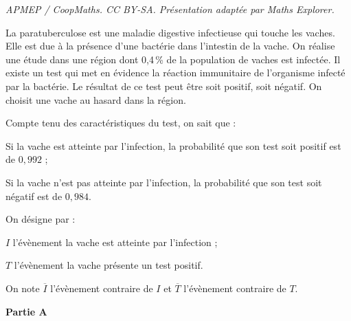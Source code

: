 \documentclass[10pt]{article}
\begin{document}
\noindent\textit{APMEP / CoopMaths. CC BY-SA. Présentation adaptée par Maths Explorer.}\par\medskip
\medskip

La paratuberculose est une maladie digestive infectieuse qui touche les vaches. Elle est due à la présence d'une bactérie dans l'intestin de la vache.
On réalise une étude dans une région dont 0,4\,\% de la population de vaches est infectée.
Il existe un test qui met en évidence la réaction immunitaire de l'organisme infecté par la bactérie.
Le résultat de ce test peut être soit \og positif\fg{}, soit \og négatif\fg{}.
On choisit une vache au hasard dans la région.

\begin{list}{\textbullet}{Compte tenu des caractéristiques du test, on sait que :}
\item Si la vache est atteinte par l'infection, la probabilité que son test soit positif est de $0,992$ ;
\item Si la vache n'est pas atteinte par l'infection, la probabilité que son test soit négatif est de $0,984$.
\end{list}

\begin{list}{\textbullet}{On désigne par :}
		\item $I$ l'évènement \og{}la vache est atteinte par l'infection\fg{} ;
		\item $T$ l'évènement \og{}la vache présente un test positif\fg{}.
	\end{list}

On note $\overline{I}$ l'évènement contraire de $I$ et $\overline{T}$ l'évènement contraire de $T$.





\bigskip

\textbf{Partie A}
\end{document}
